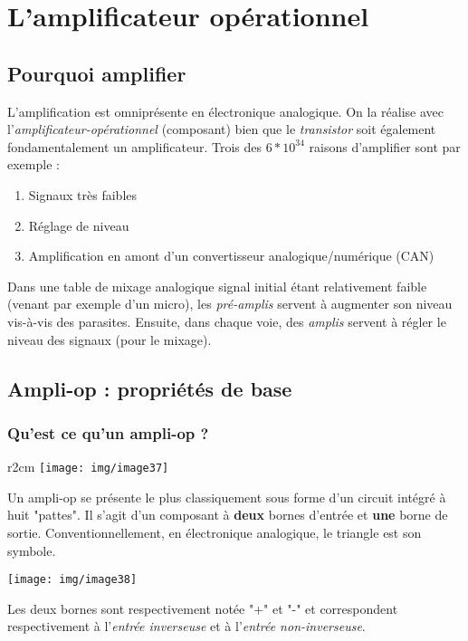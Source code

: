 \chapter{L'amplificateur opérationnel}
\setcounter{section}{-1}
\section{Pourquoi amplifier}
L'amplification est omniprésente en électronique analogique. On la réalise avec l'\textit{amplificateur-opérationnel} (composant) bien que le \textit{transistor} soit également fondamentalement un amplificateur. Trois des $6*10^{34}$ raisons d'amplifier sont par exemple : 
\begin{enumerate}
\item Signaux très faibles
\item Réglage de niveau
\item Amplification en amont d'un convertisseur analogique/numérique (CAN)
\end{enumerate}

Dans une  table de mixage analogique signal initial étant relativement faible (venant par exemple d'un micro), les \textit{pré-amplis} servent à augmenter son niveau vis-à-vis des parasites. Ensuite, dans chaque voie, des \textit{amplis} servent à régler le niveau des signaux (pour le mixage).



\section{Ampli-op : propriétés de base}
\subsection{Qu'est ce qu'un ampli-op ?}
\begin{wrapfigure}[5]{r}{2cm}
\texttt{[image: img/image37]}
\end{wrapfigure}

Un ampli-op se présente le plus classiquement sous forme d'un circuit intégré à huit "pattes". Il s'agit d'un composant à \textbf{deux} bornes d'entrée et \textbf{une} borne de sortie. Conventionnellement, en électronique analogique, le triangle est son symbole.
\begin{center}
\texttt{[image: img/image38]}
\end{center}
Les deux bornes sont respectivement notée "+" et "-" et correspondent respectivement à l'\textit{entrée inverseuse} et à l'\textit{entrée non-inverseuse}.

